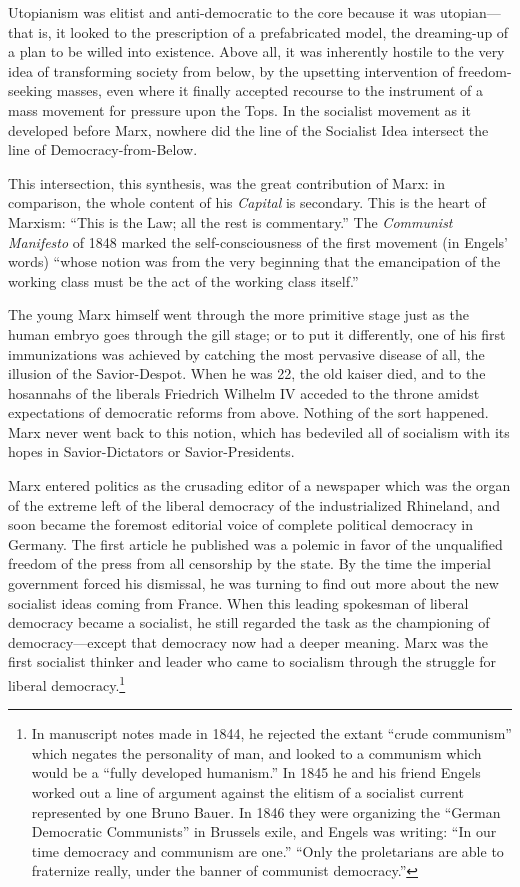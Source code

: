 Utopianism was elitist and anti-democratic to the core because it was utopian---that is, it looked to the prescription of a prefabricated model, the dreaming-up of a plan to be willed into existence. Above all, it was inherently hostile to the very idea of transforming society from below, by the upsetting intervention of freedom-seeking masses, even where it finally accepted recourse to the instrument of a mass movement for pressure upon the Tops. In the socialist movement as it developed before Marx, nowhere did the line of the Socialist Idea intersect the line of Democracy-from-Below.

This intersection, this synthesis, was the great contribution of Marx: in comparison, the whole content of his \emph{Capital} is secondary. This is the heart of Marxism: ``This is the Law; all the rest is commentary.'' The \emph{Communist Manifesto} of 1848 marked the self-consciousness of the first movement (in Engels' words) ``whose notion was from the very beginning that the emancipation of the working class must be the act of the working class itself.''

The young Marx himself went through the more primitive stage just as the human embryo goes through the gill stage; or to put it differently, one of his first immunizations was achieved by catching the most pervasive disease of all, the illusion of the Savior-Despot. When he was 22, the old kaiser died, and to the hosannahs of the liberals Friedrich Wilhelm IV acceded to the throne amidst expectations of democratic reforms from above. Nothing of the sort happened. Marx never went back to this notion, which has bedeviled all of socialism with its hopes in Savior-Dictators or Savior-Presidents.

Marx entered politics as the crusading editor of a newspaper which was the organ of the extreme left of the liberal democracy of the industrialized Rhineland, and soon became the foremost editorial voice of complete political democracy in Germany. The first article he published was a polemic in favor of the unqualified freedom of the press from all censorship by the state. By the time the imperial government forced his dismissal, he was turning to find out more about the new socialist ideas coming from France. When this leading spokesman of liberal democracy became a socialist, he still regarded the task as the championing of democracy---except that democracy now had a deeper meaning. Marx was the first socialist thinker and leader who came to socialism through the struggle for liberal democracy.\footnote{In manuscript notes made in 1844, he rejected the extant ``crude communism'' which negates the personality of man, and looked to a communism which would be a ``fully developed humanism.'' In 1845 he and his friend Engels worked out a line of argument against the elitism of a socialist current represented by one Bruno Bauer. In 1846 they were organizing the ``German Democratic Communists'' in Brussels exile, and Engels was writing: ``In our time democracy and communism are one.'' ``Only the proletarians are able to fraternize really, under the banner of communist democracy.''}

